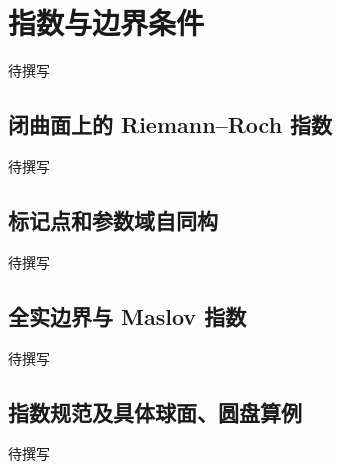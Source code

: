 
% 
% 
% 

\section{指数与边界条件}
\label{g4:sec:2204}

待撰写

\subsection{闭曲面上的 Riemann–Roch 指数}
\label{g4:subsec:2204:01}
待撰写

\subsection{标记点和参数域自同构}
\label{g4:subsec:2204:02}
待撰写

\subsection{全实边界与 Maslov 指数}
\label{g4:subsec:2204:03}
待撰写

\subsection{指数规范及具体球面、圆盘算例}
\label{g4:subsec:2204:04}
待撰写

